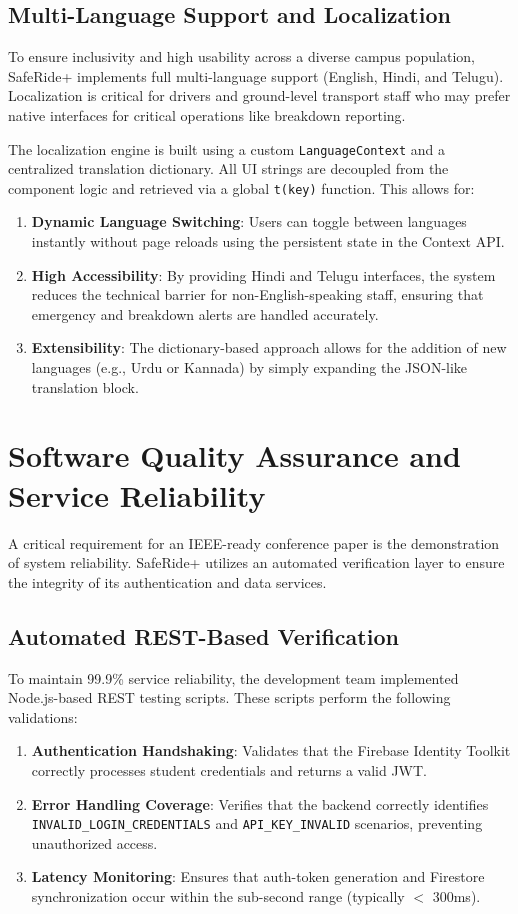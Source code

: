 \documentclass[conference]{IEEEtran}
\begin{document}
\subsection{Multi-Language Support and Localization}
To ensure inclusivity and high usability across a diverse campus population, SafeRide+ implements full multi-language support (English, Hindi, and Telugu). Localization is critical for drivers and ground-level transport staff who may prefer native interfaces for critical operations like breakdown reporting.

The localization engine is built using a custom \texttt{LanguageContext} and a centralized translation dictionary. All UI strings are decoupled from the component logic and retrieved via a global \texttt{t(key)} function. This allows for:
\begin{enumerate}
    \item \textbf{Dynamic Language Switching}: Users can toggle between languages instantly without page reloads using the persistent state in the Context API.
    \item \textbf{High Accessibility}: By providing Hindi and Telugu interfaces, the system reduces the technical barrier for non-English-speaking staff, ensuring that emergency and breakdown alerts are handled accurately.
    \item \textbf{Extensibility}: The dictionary-based approach allows for the addition of new languages (e.g., Urdu or Kannada) by simply expanding the JSON-like translation block.
\end{enumerate}

\section{Software Quality Assurance and Service Reliability}
A critical requirement for an IEEE-ready conference paper is the demonstration of system reliability. SafeRide+ utilizes an automated verification layer to ensure the integrity of its authentication and data services.

\subsection{Automated REST-Based Verification}
To maintain 99.9\% service reliability, the development team implemented Node.js-based REST testing scripts. These scripts perform the following validations:
\begin{enumerate}
    \item \textbf{Authentication Handshaking}: Validates that the Firebase Identity Toolkit correctly processes student credentials and returns a valid JWT.
    \item \textbf{Error Handling Coverage}: Verifies that the backend correctly identifies \texttt{INVALID_LOGIN_CREDENTIALS} and \texttt{API_KEY_INVALID} scenarios, preventing unauthorized access.
    \item \textbf{Latency Monitoring}: Ensures that auth-token generation and Firestore synchronization occur within the sub-second range (typically $<$ 300ms).
\end{enumerate}
\end{document}
